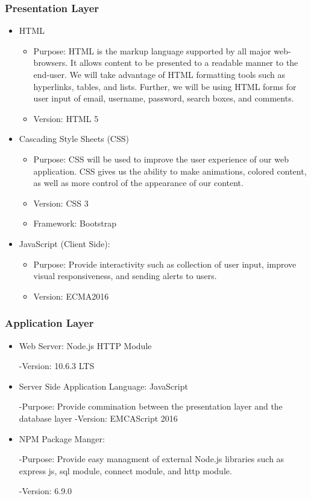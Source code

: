 \documentclass[letter, 12pt, titlepage]{article}
\begin{document}
\subsubsection{Presentation Layer}
\begin{itemize}
	\item HTML
	      \begin{itemize}
		      \item Purpose: HTML is the markup language supported by all major web-browsers. It allows content to be presented to a readable manner to the end-user. We will take advantage of HTML formatting tools such as hyperlinks, tables, and lists. Further, we will be using HTML forms for user input of email, username, password, search boxes, and comments.
		      \item Version: HTML 5
	      \end{itemize}
	\item Cascading Style Sheets (CSS)
	      \begin{itemize}
		      \item Purpose: CSS will be used to improve the user experience of our web application. CSS gives us the ability to make animations, colored content, as well as more control of the appearance of our content.
		      \item Version: CSS 3
		      \item Framework: Bootstrap
	      \end{itemize}
	\item	JavaScript (Client Side):
	      \begin{itemize}
		      \item	Purpose: Provide interactivity such as collection of user input, improve visual responsiveness, and sending alerts to users.
		      \item Version: ECMA2016
	      \end{itemize}
\end{itemize}

\subsubsection{Application Layer}
\begin{itemize}
	\item Web Server: Node.js HTTP Module

	      -Version: 10.6.3 LTS

	\item Server Side Application Language: JavaScript

	      -Purpose: Provide commination between the presentation layer and the database layer
	      -Version: EMCAScript 2016

	\item	NPM Package Manger:

	      -Purpose: Provide easy managment of external Node.js libraries such as express js, sql module, connect module, and http module.

	      -Version: 6.9.0
\end{itemize}
\end{document}
